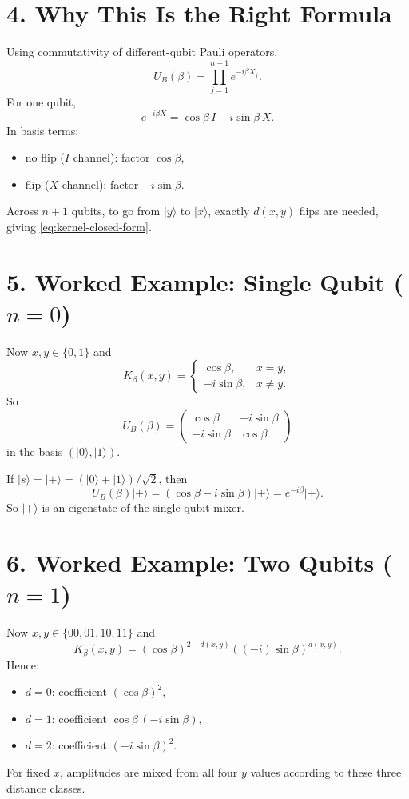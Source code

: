 \documentclass[11pt]{article}
\begin{document}
	\section*{4. Why This Is the Right Formula}
	Using commutativity of different-qubit Pauli operators,
	\[
	U_B(\beta) = \prod_{j=1}^{n+1} e^{-i\beta X_j}.
	\]
	For one qubit,
	\[
	e^{-i\beta X} = \cos\beta\,I - i\sin\beta\,X.
	\]
	In basis terms:
	\begin{itemize}
		\item no flip ($I$ channel): factor $\cos\beta$,
		\item flip ($X$ channel): factor $-i\sin\beta$.
	\end{itemize}
	Across $n+1$ qubits, to go from $|y\rangle$ to $|x\rangle$, exactly $d(x,y)$ flips are needed, giving \eqref{eq:kernel-closed-form}.
	
	\section*{5. Worked Example: Single Qubit ($n=0$)}
	Now $x,y\in\{0,1\}$ and
	\[
	K_\beta(x,y)=
	\begin{cases}
	\cos\beta, & x=y,\\
	-i\sin\beta, & x\neq y.
	\end{cases}
	\]
	So
	\[
	U_B(\beta)=
	\begin{pmatrix}
	\cos\beta & -i\sin\beta\\
	-i\sin\beta & \cos\beta
	\end{pmatrix}
	\]
	in the basis $(|0\rangle,|1\rangle)$.
	
	If $|s\rangle=|+\rangle=(|0\rangle+|1\rangle)/\sqrt2$, then
	\[
	U_B(\beta)|+\rangle
	= (\cos\beta - i\sin\beta)|+\rangle
	= e^{-i\beta}|+\rangle.
	\]
	So $|+\rangle$ is an eigenstate of the single-qubit mixer.
	
	\section*{6. Worked Example: Two Qubits ($n=1$)}
	Now $x,y\in\{00,01,10,11\}$ and
	\[
	K_\beta(x,y)=(\cos\beta)^{2-d(x,y)}((-i)\sin\beta)^{d(x,y)}.
	\]
	Hence:
	\begin{itemize}
		\item $d=0$: coefficient $(\cos\beta)^2$,
		\item $d=1$: coefficient $\cos\beta\,(-i\sin\beta)$,
		\item $d=2$: coefficient $(-i\sin\beta)^2$.
	\end{itemize}
	For fixed $x$, amplitudes are mixed from all four $y$ values according to these three distance classes.
	
\end{document}

